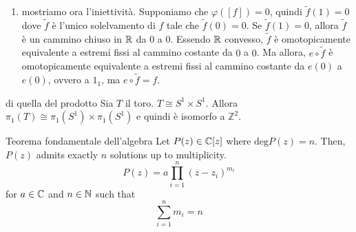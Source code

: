 \documentclass[a4paper]{article}
\begin{document}
\begin{snippetproof}{}
\begin{enumerate}
        \[
            \varphi([e \circ g_n]) = n
        \]
        \item mostriamo ora l'iniettività.
        Supponiamo che \(\varphi([f]) = 0\), quindi \(\tilde f(1) = 0\)
        dove \(\tilde f\) è l'unico solelvamento di \(f\) tale che \(\tilde f(0) = 0\).
        Se \(\tilde f(1) = 0\), allora \(\tilde f\) è un cammino chiuso
        in \(\mathbb{R}\) da \(0\) a \(0\).
        Essendo \(\mathbb{R}\) convesso, \(\tilde f\) è omotopicamente equivalente a
        estremi fissi al cammino costante da \(0\) a \(0\).
        Ma allora, \(e \circ \tilde f\) è omotopicamente equivalente a
        estremi fissi al cammino costante da \(e(0)\) a \(e(0)\),
        ovvero a \(1_1\), ma \(e \circ \tilde f = f\).
    \end{enumerate}
\end{snippetproof}

\begin{snippetcorollary}{di quella del prodotto}
    Sia \(T\) il toro.
    \(T \cong S^1 \times S^1\). Allora \(\pi_1(T) \cong \pi_1(S^1) \times \pi_1(S^1)\)
    e quindi è isomorfo a \(\mathbb{Z}^2\).
\end{snippetcorollary}

\begin{snippettheorem}{Teorema fondamentale dell'algebra}
    Let \(P(z) \in \mathbb{C}[z]\) where \(\text{deg} P(z) = n\). Then,
    \(P(z)\) admits exactly \(n\) solutions up to multiplicity.
    \[
        P(z) = a\prod_{i=1}^n (z-z_i)^{m_i}
    \]
    for \(a\in\mathbb{C}\) and \(n\in \mathbb{N}\) such that
    \[
        \sum_{i=1}^n m_i = n
    \]
\end{snippettheorem}
\end{document}
